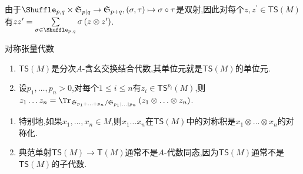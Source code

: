\begin{remark}{}{}
	由于$\Shuffle_{p,q}\times\mathfrak{S}_{p|q}\to\mathfrak{S}_{p+q},\left(\sigma,\tau\right)\mapsto\sigma\circ\tau$是双射,因此对每个$z,z^{\prime}\in\mathsf{TS}\left(M\right)$有$zz^{\prime}=\sum\limits_{\sigma\in\Shuffle_{p,q}}\sigma\left(z\otimes z^{\prime}\right)$.
\end{remark}

\begin{proposition}{对称张量代数}{}
	\begin{enumerate}
		\item $\mathsf{TS}\left(M\right)$是分次$A$-含幺交换结合代数,其单位元就是$\mathsf{TS}\left(M\right)$的单位元.
		\item 设$p_{1},\ldots,p_{n}>0$,对每个$1\leq i\leq n$有$z_{i}\in\mathsf{TS}^{p_{i}}\left(M\right)$,则$z_{1}\ldots z_{n}=\Tr_{\mathfrak{S}_{p_{1}+\ldots+p_{n}}/\mathfrak{S}_{p_{1}|\ldots|p_{n}}}\left(z_{1}\otimes\ldots\otimes z_{n}\right)$.
	\end{enumerate}
\end{proposition}

\begin{remark}{}{}
	\begin{enumerate}
		\item 特别地,如果$x_{1},\ldots,x_{n}\in M$,则$x_{1}\ldots x_{n}$在$\mathsf{TS}\left(M\right)$中的对称积是$x_{1}\otimes\ldots\otimes x_{n}$的对称化.
		\item 典范单射$\mathsf{TS}\left(M\right)\to\mathsf{T}\left(M\right)$通常不是$A$-代数同态,因为$\mathsf{TS}\left(M\right)$通常不是$\mathsf{TS}\left(M\right)$的子代数.
	\end{enumerate}
\end{remark}











